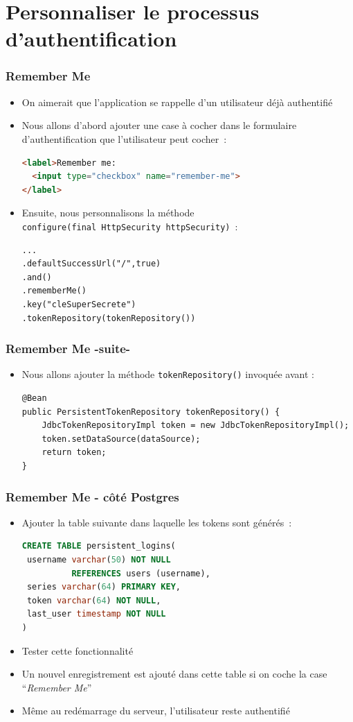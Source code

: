 \documentclass{beamer}
\begin{document}
\section{Personnaliser le processus d'authentification}

\begin{frame}[fragile]
	\frametitle{Remember Me}
	\begin{itemize}
		\item On aimerait que l'application se rappelle d'un utilisateur déjà authentifié
		\item Nous allons d'abord ajouter une case à cocher dans le formulaire d'authentification que l'utilisateur peut cocher~:
\begin{lstlisting}[language=Html]
<label>Remember me: 
  <input type="checkbox" name="remember-me">
</label>
\end{lstlisting}
\item Ensuite, nous personnalisons la méthode \\
\footnotesize\texttt{configure(final HttpSecurity httpSecurity)}~:\normalsize
\begin{lstlisting}
...
.defaultSuccessUrl("/",true)
.and()
.rememberMe()
.key("cleSuperSecrete")
.tokenRepository(tokenRepository())
\end{lstlisting}
	\end{itemize}
\end{frame}

\begin{frame}[fragile]
	\frametitle{Remember Me -suite-}
	\begin{itemize}
		\item Nous allons ajouter la méthode \texttt{tokenRepository()} invoquée avant :
\begin{lstlisting}
@Bean
public PersistentTokenRepository tokenRepository() {
	JdbcTokenRepositoryImpl token = new JdbcTokenRepositoryImpl();
	token.setDataSource(dataSource);
	return token;
}
\end{lstlisting}
	\end{itemize}
\end{frame}

\begin{frame}[fragile]
	\frametitle{Remember Me - côté Postgres}
	\begin{itemize}
		\item Ajouter la table suivante dans laquelle les tokens sont générés~:
\begin{lstlisting}[language=Sql]
CREATE TABLE persistent_logins(
 username varchar(50) NOT NULL 
          REFERENCES users (username),
 series varchar(64) PRIMARY KEY,
 token varchar(64) NOT NULL,
 last_user timestamp NOT NULL
)
\end{lstlisting}
\item Tester cette fonctionnalité
\item Un nouvel enregistrement est ajouté dans cette table si on coche la case ``\textit{Remember Me}''
\item Même au redémarrage du serveur, l'utilisateur reste authentifié
	\end{itemize}
\end{frame}
\end{document}
